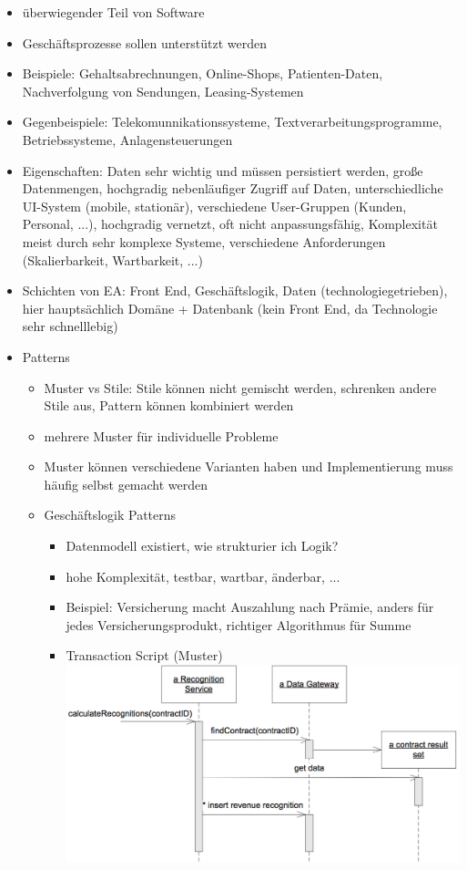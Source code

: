 \documentclass[paper=a4, fontsize=11pt]{scrartcl} %
\numberwithin{equation}{section} %
\numberwithin{figure}{section} %
\numberwithin{table}{section} %
\begin{document}
\begin{itemize}
  \item überwiegender Teil von Software
  \item Geschäftsprozesse sollen unterstützt werden
  \item Beispiele: Gehaltsabrechnungen, Online-Shops, Patienten-Daten, Nachverfolgung von Sendungen, Leasing-Systemen
  \item Gegenbeispiele: Telekomunnikationssysteme, Textverarbeitungsprogramme, Betriebssysteme, Anlagensteuerungen
  \item Eigenschaften: Daten sehr wichtig und müssen persistiert werden, große Datenmengen, hochgradig nebenläufiger Zugriff auf Daten, unterschiedliche UI-System (mobile, stationär), verschiedene User-Gruppen (Kunden, Personal, ...), hochgradig vernetzt, oft nicht anpassungsfähig, Komplexität meist durch sehr komplexe Systeme, verschiedene Anforderungen (Skalierbarkeit, Wartbarkeit, ...)
  \item Schichten von EA: Front End, Geschäftslogik, Daten (technologiegetrieben), hier hauptsächlich Domäne + Datenbank (kein Front End, da Technologie sehr schnelllebig)
  \item Patterns
  \begin{itemize}
    \item Muster vs Stile: Stile können nicht gemischt werden, schrenken andere Stile aus, Pattern können kombiniert werden
    \item mehrere Muster für individuelle Probleme
    \item Muster können verschiedene Varianten haben und Implementierung muss häufig selbst gemacht werden
    \item Geschäftslogik Patterns
    \begin{itemize}
      \item Datenmodell existiert, wie strukturier ich Logik?
      \item hohe Komplexität, testbar, wartbar, änderbar, ...
      \item Beispiel: Versicherung macht Auszahlung nach Prämie, anders für jedes Versicherungsprodukt, richtiger Algorithmus für Summe
      \item Transaction Script (Muster)\\
      \includegraphics[width=.7\textwidth]{imgs/transactionscript}

\end{itemize}
\end{itemize}
\end{itemize}
\end{document}
